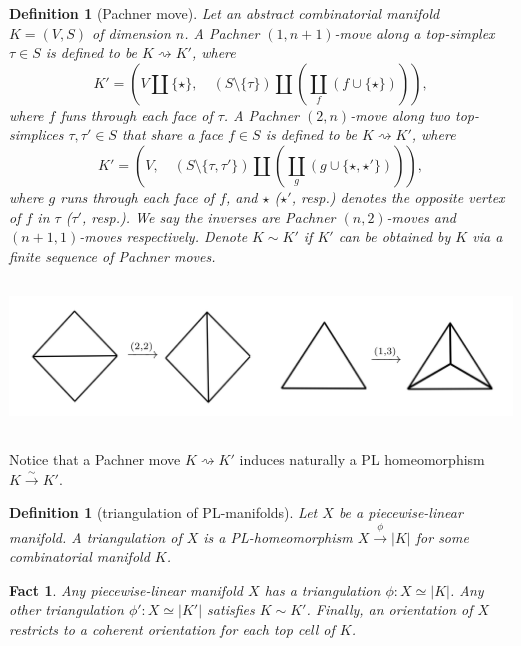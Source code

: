 \documentclass[12pt]{extarticle}
\numberwithin{equation}{section} %
\theoremstyle{mystyle}
\newtheorem{fact}[equation]{Fact}
\newtheorem{definition}[equation]{Definition}
\begin{document}
\begin{definition}[Pachner move]\label{def/pachner-move}
  Let an abstract combinatorial manifold $K = (V,S)$ of
  dimension $n$. A Pachner $(1,n+1)$-move along a top-simplex
  $\tau \in S$ is defined to be $K \rightsquigarrow K'$, where
  $$
  K' = \left(
    V \coprod \{\star\},\quad (S\setminus\{\tau\}) \coprod (\coprod_{f} (f \cup \{\star\}))
  \right),
  $$
  where $f$ funs through each face of $\tau$. A Pachner
  $(2,n)$-move along two top-simplices $\tau, \tau' \in S$ that
  share a face $f \in S$ is defined to be
  $K \rightsquigarrow K'$, where
  $$ K' = \left (V,\quad (S\setminus\{\tau,\tau'\}) \coprod (\coprod_{g} (g \cup \{\star, \star'\})) \right),$$
  where $g$ runs through each face of $f$, and $\star$ ($\star'$,
  resp.) denotes the opposite vertex of $f$ in $\tau$ ($\tau'$,
  resp.). We say the inverses are Pachner $(n,2)$-moves and
  $(n+1,1)$-moves respectively. Denote $K \sim K'$ if $K'$ can be
  obtained by $K$ via a finite sequence of Pachner moves.
  \begin{center}
    \includegraphics[height=4cm]{pachner-move}
  \end{center}
\end{definition}

\noindent Notice that a Pachner move $K \rightsquigarrow K'$
induces naturally a PL homeomorphism $K \xrightarrow{\sim} K'$.

\begin{definition}[triangulation of PL-manifolds] Let $X$ be a
  piecewise-linear manifold. A triangulation of $X$ is a
  PL-homeomorphism $X \xrightarrow{\phi} |K|$ for some
  combinatorial manifold $K$.
\end{definition}

\begin{fact}
  Any piecewise-linear manifold $X$ has a triangulation
  $\phi: X \simeq |K|$. Any other triangulation
  $\phi': X \simeq |K'|$ satisfies $K \sim K'$. Finally, an
  orientation of $X$ restricts to a coherent orientation for each
  top cell of $K$.
\end{fact}
\end{document}
